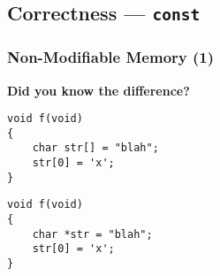 \subsection{Correctness --- \texttt{const}}

\begin{frame}[fragile]
  \frametitle{Non-Modifiable Memory (1)}


  \textbf{Did you know the difference?}

  \begin{block}{}
\begin{verbatim}
void f(void)
{
    char str[] = "blah";
    str[0] = 'x';
}
\end{verbatim}
  \end{block}

  \begin{block}{}
\begin{verbatim}
void f(void)
{
    char *str = "blah";
    str[0] = 'x';
}
\end{verbatim}
  \end{block}

\end{frame}

